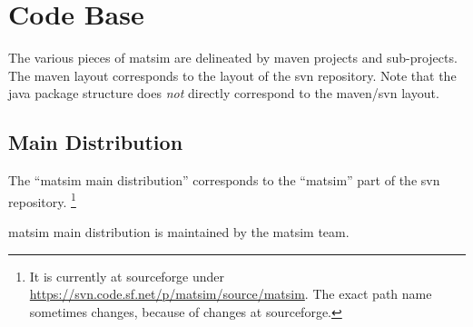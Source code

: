 \section{Code Base}
\label{sec:core-contribs-playgrounds}
The various pieces of \gls{matsim} are delineated by \gls{maven} projects and sub-projects. 
The \gls{maven} layout corresponds to the layout of the \gls{svn} repository.  
Note that the \gls{java} package structure does \emph{not} directly correspond to the \gls{maven}/\gls{svn} layout.

\subsection{Main Distribution}
\label{sec:extending-main}
The ``\gls{matsim} main distribution'' corresponds to the ``matsim'' part of the \gls{svn} repository.%
\footnote{
It is currently at \gls{sourceforge} under \url{https://svn.code.sf.net/p/matsim/source/matsim}. 
The exact path name sometimes changes, \eg because of changes at \gls{sourceforge}.
}

\gls{matsim} main distribution is maintained by the \gls{matsim} team.

